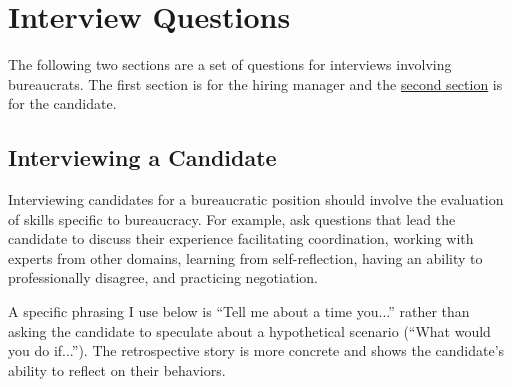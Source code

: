 \chapter{Interview Questions}

The following two sections are a set of questions for interviews involving bureaucrats. The first section is for the hiring manager and the \hyperref[sec:moving-to-new-team]{second section}%
\iftoggle{haspagenumbers}{ (starting on page~\pageref{sec:moving-to-new-team})}{} is for the candidate.


\section*{Interviewing a Candidate}

Interviewing candidates for a bureaucratic position should involve the evaluation of skills specific to bureaucracy. For example, ask questions that lead the candidate to discuss  their experience facilitating coordination, working with experts from other domains, learning from self-reflection, having an ability to professionally disagree, and practicing negotiation. 

A specific phrasing I use below is ``Tell me about a time you...'' rather than asking the candidate to speculate about a hypothetical scenario (``What would you do if...''). The retrospective story is more concrete and shows the candidate's ability to reflect on their behaviors.


